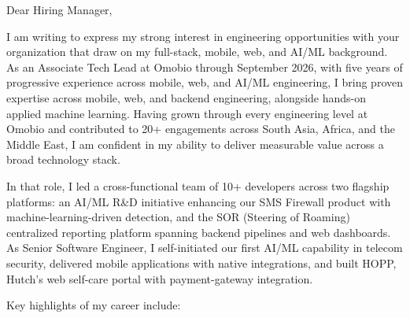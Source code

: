 \documentclass[11pt]{article}
\begin{document}

Dear Hiring Manager,

I am writing to express my strong interest in engineering opportunities with your organization that draw on my full-stack, mobile, web, and AI/ML background. As an Associate Tech Lead at Omobio through September 2026, with five years of progressive experience across mobile, web, and AI/ML engineering, I bring proven expertise across mobile, web, and backend engineering, alongside hands-on applied machine learning. Having grown through every engineering level at Omobio and contributed to 20+ engagements across South Asia, Africa, and the Middle East, I am confident in my ability to deliver measurable value across a broad technology stack.

In that role, I led a cross-functional team of 10+ developers across two flagship platforms: an AI/ML R\&D initiative enhancing our SMS Firewall product with machine-learning-driven detection, and the SOR (Steering of Roaming) centralized reporting platform spanning backend pipelines and web dashboards. As Senior Software Engineer, I self-initiated our first AI/ML capability in telecom security, delivered mobile applications with native integrations, and built HOPP, Hutch's web self-care portal with payment-gateway integration.

Key highlights of my career include:

\begin{clitems}
  \item {}
  \item {}
  \item {}
  \item {}
\end{clitems}
\end{document}
